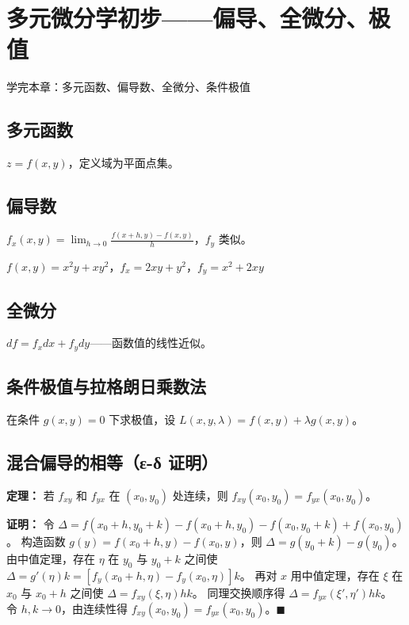 \chapter{多元微分学初步——偏导、全微分、极值}
\begin{applicationbox}
学完本章：多元函数、偏导数、全微分、条件极值
\end{applicationbox}
\section{多元函数} \(z=f(x,y)\)，定义域为平面点集。

\section{偏导数} \(f_x(x,y)=\lim_{h\to0}\frac{f(x+h,y)-f(x,y)}{h}\)，\(f_y\) 类似。
\begin{examplebox}[1] \(f(x,y)=x^2y+xy^2\)，\(f_x=2xy+y^2\)，\(f_y=x^2+2xy\)\end{examplebox}

\section{全微分} \(df = f_x dx + f_y dy\)——函数值的线性近似。

\section{条件极值与拉格朗日乘数法} 在条件 \(g(x,y)=0\) 下求极值，设 \(L(x,y,\lambda)=f(x,y)+\lambda g(x,y)\)。

\section{混合偏导的相等（ε-δ 证明）}
\textbf{定理：} 若 \(f_{xy}\) 和 \(f_{yx}\) 在 \((x_0,y_0)\) 处连续，则 \(f_{xy}(x_0,y_0)=f_{yx}(x_0,y_0)\)。

\textbf{证明：} 令
\(\Delta = f(x_0+h,y_0+k)-f(x_0+h,y_0)-f(x_0,y_0+k)+f(x_0,y_0)\)。
构造函数 \(g(y)=f(x_0+h,y)-f(x_0,y)\)，则 \(\Delta = g(y_0+k)-g(y_0)\)。
由中值定理，存在 \(\eta\) 在 \(y_0\) 与 \(y_0+k\) 之间使 \(\Delta = g'(\eta)k = [f_y(x_0+h,\eta)-f_y(x_0,\eta)]k\)。
再对 \(x\) 用中值定理，存在 \(\xi\) 在 \(x_0\) 与 \(x_0+h\) 之间使 \(\Delta = f_{xy}(\xi,\eta)hk\)。
同理交换顺序得 \(\Delta = f_{yx}(\xi',\eta')hk\)。
令 \(h,k\to0\)，由连续性得 \(f_{xy}(x_0,y_0)=f_{yx}(x_0,y_0)\)。\(\blacksquare\)

